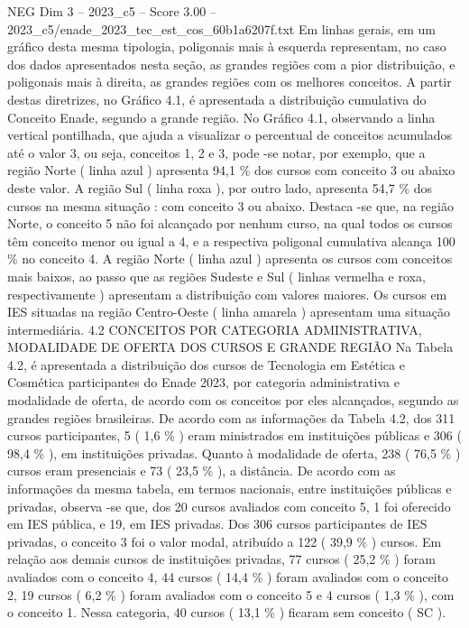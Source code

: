\begin{textsample}{NEG Dim 3 – 2023\_c5 – Score 3.00 – 2023\_c5/enade\_2023\_tec\_est\_cos\_60b1a6207f.txt}
Em linhas gerais, em um gráfico desta mesma tipologia, poligonais mais à esquerda representam, no caso dos dados apresentados nesta seção, as grandes regiões com a pior distribuição, e poligonais mais à direita, as grandes regiões com os melhores conceitos.
A partir destas diretrizes, no Gráfico 4.1, é apresentada a distribuição cumulativa do Conceito Enade, segundo a grande região.
No Gráfico 4.1, observando a linha vertical pontilhada, que ajuda a visualizar o percentual de conceitos acumulados até o valor 3, ou seja, conceitos 1, 2 e 3, pode -se notar, por exemplo, que a região Norte ( linha azul ) apresenta 94,1 \% dos cursos com conceito 3 ou abaixo deste valor.
A região Sul ( linha roxa ), por outro lado, apresenta 54,7 \% dos cursos na mesma situação : com conceito 3 ou abaixo.
Destaca -se que, na região Norte, o conceito 5 não foi alcançado por nenhum curso, na qual todos os cursos têm conceito menor ou igual a 4, e a respectiva poligonal cumulativa alcança 100 \% no conceito 4.
A região Norte ( linha azul ) apresenta os cursos com conceitos mais baixos, ao passo que as regiões Sudeste e Sul ( linhas vermelha e roxa, respectivamente ) apresentam a distribuição com valores maiores.
Os cursos em IES situadas na região Centro-Oeste ( linha amarela ) apresentam uma situação intermediária. 4.2 CONCEITOS POR CATEGORIA ADMINISTRATIVA, MODALIDADE DE OFERTA DOS CURSOS E GRANDE REGIÃO Na Tabela 4.2, é apresentada a distribuição dos cursos de Tecnologia em Estética e Cosmética participantes do Enade 2023, por categoria administrativa e modalidade de oferta, de acordo com os conceitos por eles alcançados, segundo as grandes regiões brasileiras.
De acordo com as informações da Tabela 4.2, dos 311 cursos participantes, 5 ( 1,6 \% ) eram ministrados em instituições públicas e 306 ( 98,4 \% ), em instituições privadas.
Quanto à modalidade de oferta, 238 ( 76,5 \% ) cursos eram presenciais e 73 ( 23,5 \% ), a distância.
De acordo com as informações da mesma tabela, em termos nacionais, entre instituições públicas e privadas, observa -se que, dos 20 cursos avaliados com conceito 5, 1 foi oferecido em IES pública, e 19, em IES privadas.
Dos 306 cursos participantes de IES privadas, o conceito 3 foi o valor modal, atribuído a 122 ( 39,9 \% ) cursos.
Em relação aos demais cursos de instituições privadas, 77 cursos ( 25,2 \% ) foram avaliados com o conceito 4, 44 cursos ( 14,4 \% ) foram avaliados com o conceito 2, 19 cursos ( 6,2 \% ) foram avaliados com o conceito 5 e 4 cursos ( 1,3 \% ), com o conceito 1.
Nessa categoria, 40 cursos ( 13,1 \% ) ficaram sem conceito ( SC ).

\end{textsample}
